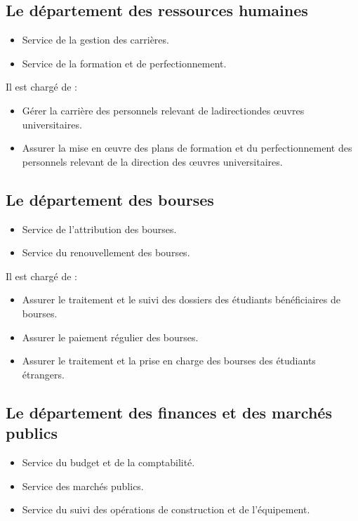     \subsection{Le département des ressources humaines}
        \begin{itemize}
            \item Service de la gestion des carrières.
            \item Service de la formation et de perfectionnement.\\
        \end{itemize}

        Il est chargé de :
        \begin{itemize}\renewcommand{\labelitemi}{$\bullet$}
            \item Gérer la carrière des personnels relevant de ladirectiondes œuvres universitaires.
            \item Assurer la mise en œuvre des plans de formation et du perfectionnement des personnels relevant de la direction des œuvres universitaires.
        \end{itemize}

    \subsection{Le département des bourses}
        \begin{itemize}
            \item Service de l'attribution des bourses.
            \item Service du renouvellement des bourses.\\
        \end{itemize}
        
        Il est chargé de :
        \begin{itemize}\renewcommand{\labelitemi}{$\bullet$}
            \item Assurer le traitement et le suivi des dossiers des étudiants bénéficiaires de bourses.
            \item Assurer le paiement régulier des bourses.
            \item Assurer le traitement et la prise en charge des bourses des étudiants étrangers.
        \end{itemize}

    \subsection{Le département des finances et des marchés publics}
        \begin{itemize}
            \item Service du budget et de la comptabilité.
            \item Service des marchés publics.
            \item Service du suivi des opérations de construction et de l'équipement.\\
        \end{itemize}

